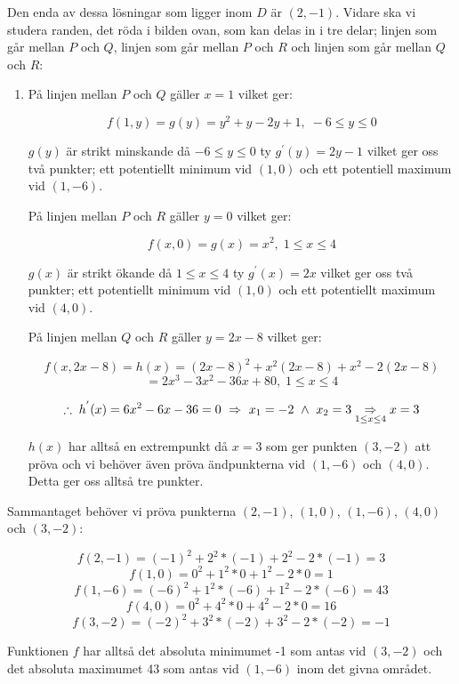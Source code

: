 \documentclass{article}
\begin{document}
\vskip 0.2cm

Den enda av dessa lösningar som ligger inom $D$ är $(2, -1)$. Vidare ska vi studera randen, det röda i bilden ovan, som kan delas in i tre delar; linjen som går mellan $P$ och $Q$, linjen som går mellan $P$ och $R$ och linjen som går mellan $Q$ och $R$:

\vskip 0.3cm

\begin{enumerate}
    \item[]
        På linjen mellan $P$ och $Q$ gäller $x=1$ vilket ger:

        $$
        f(1, y)=g(y)=y^2+y-2y+1, \; -6\leq y\leq0
        $$

        \vskip 0.2cm

        $g(y)$ är strikt minskande då $-6\leq y\leq0$ ty $g^{'}(y)=2y-1$ vilket ger oss två punkter; ett potentiellt minimum vid $(1, 0)$ och ett potentiell maximum vid $(1, -6)$. 

        \vskip 0.3cm

        På linjen mellan $P$ och $R$ gäller $y=0$ vilket ger:

        $$
        f(x, 0)=g(x)=x^2, \; 1\leq x\leq4
        $$

        \newpage

        $g(x)$ är strikt ökande då $1\leq x\leq4$ ty $g^{'}(x)=2x$ vilket ger oss två punkter; ett potentiellt minimum vid $(1, 0)$ och ett potentiellt maximum vid $(4, 0)$.

        \vskip 0.3cm

        På linjen mellan $Q$ och $R$ gäller $y=2x-8$ vilket ger:

        $$
        f(x, 2x-8)=h(x)=(2x-8)^2+x^2(2x-8)+x^2-2(2x-8)
        $$
        $$
        =
        2x^3-3x^2-36x+80,\; 1\leq x\leq4
        $$

        $$
        \therefore\;
        h^{'}(x)=6x^2-6x-36=0
        \ \Rightarrow \ 
        x_{1}=-2 \ \wedge \  x_{2}=3
        \underset{1\leq x\leq4}{\ \Rightarrow \ }
        x=3
        $$

        \vskip 0.2cm

        $h(x)$ har alltså en extrempunkt då $x=3$ som ger punkten $(3, -2)$ att pröva och vi behöver även pröva ändpunkterna vid $(1, -6)$ och $(4, 0)$. Detta ger oss alltså tre punkter.
\end{enumerate}

Sammantaget behöver vi pröva punkterna $(2, -1)$, $(1, 0)$, $(1, -6)$, $(4, 0)$ och $(3, -2)$:

$$
f(2, -1)=(-1)^2+2^2*(-1)+2^2-2*(-1)=3
$$
$$
f(1, 0)=0^2+1^2*0+1^2-2*0=1
$$
$$
f(1, -6)=(-6)^2+1^2*(-6)+1^2-2*(-6)=43
$$
$$
f(4, 0)=0^2+4^2*0+4^2-2*0=16
$$
$$
f(3, -2)=(-2)^2+3^2*(-2)+3^2-2*(-2)=-1
$$

\vskip 0.2cm

Funktionen $f$ har alltså det absoluta minimumet -1 som antas vid $(3, -2)$ och det absoluta maximumet 43 som antas vid $(1, -6)$ inom det givna området.
\end{document}
